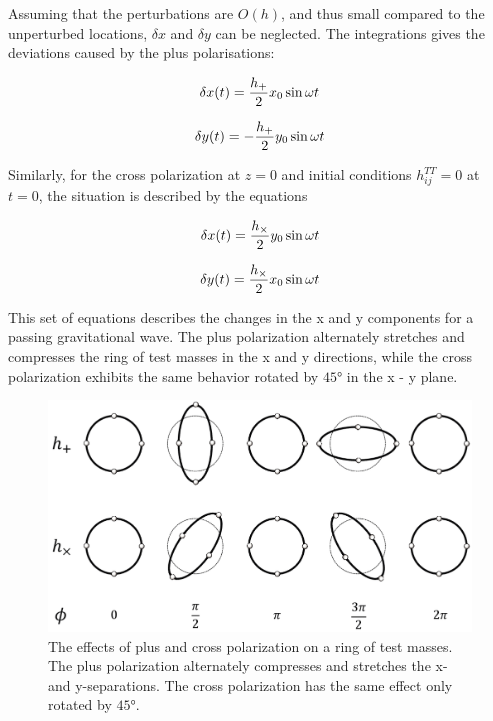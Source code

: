 \documentclass[binding=0.6cm, LaM]{sapthesis}
\begin{document}
	Assuming that the perturbations are $O(h)$, and thus small compared to the unperturbed locations, $\delta x$ and $\delta y$ can be neglected.
	The integrations gives the deviations caused by the plus polarisations:

		\begin{equation}
		\delta x(t) =  {{h_{+}} \over 2} x_0 \sin \omega t
		\end{equation}

		\begin{equation}
		\delta y(t) = - {{h_{+}} \over 2} y_0  \sin \omega t
		\end{equation}

	Similarly, for the cross polarization at $z=0$ and initial conditions $h_{ij}^{TT} = 0$ at $t= 0$, the situation is described by the equations
		
		\begin{equation}
		\delta x(t) =  {{h_{\times}} \over 2} y_0 \sin \omega t
		\end{equation}

		\begin{equation}
		\delta y(t) =  {{h_{\times}} \over 2} x_0  \sin \omega t
		\end{equation}
		
	This set of equations describes the changes in the x and y components for a passing gravitational wave.
	The plus polarization alternately stretches and compresses the ring of test masses in the x and y directions, 
	while the cross polarization exhibits the same behavior rotated by $\ang{45}$ in the x - y plane.

		\begin{figure}
		\includegraphics[scale=1]{ring}
		\centering
		\caption{The effects of plus and cross polarization on a ring of test masses. 
			 The plus polarization alternately compresses and stretches the x- and y-separations.
			 The cross polarization has the same effect only rotated by  $\ang{45}$.}
		\label{fig:ring}
		\end{figure}
\end{document}
